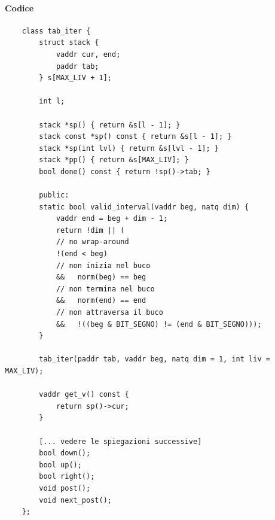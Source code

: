 \paragraph{Codice}
\small
\begin{verbatim}
	class tab_iter {
		struct stack {
			vaddr cur, end;
			paddr tab;
		} s[MAX_LIV + 1];
		
		int l;
		
		stack *sp() { return &s[l - 1]; }
		stack const *sp() const { return &s[l - 1]; }
		stack *sp(int lvl) { return &s[lvl - 1]; }
		stack *pp() { return &s[MAX_LIV]; }
		bool done() const { return !sp()->tab; }
		
		public:
		static bool valid_interval(vaddr beg, natq dim) {
			vaddr end = beg + dim - 1;
			return !dim || (
			// no wrap-around
			!(end < beg)
			// non inizia nel buco
			&&   norm(beg) == beg
			// non termina nel buco
			&&   norm(end) == end
			// non attraversa il buco
			&&   !((beg & BIT_SEGNO) != (end & BIT_SEGNO)));
		}
		
		tab_iter(paddr tab, vaddr beg, natq dim = 1, int liv = MAX_LIV);
		
		vaddr get_v() const {
			return sp()->cur;
		}
		
		[... vedere le spiegazioni successive]
		bool down();
		bool up();
		bool right();
		void post();
		void next_post();
	};
\end{verbatim} 
\normalsize

